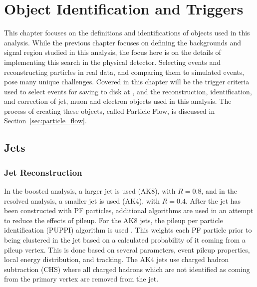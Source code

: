 \chapter{Object Identification and Triggers  }
\label{ch:objs}
This chapter focuses on the definitions and identifications of objects used in this analysis. While the previous chapter focuses on defining the backgrounds and signal region studied in this analysis, the focus here is on the details of implementing this search in the physical \CMS detector. Selecting events and reconstructing particles in real data, and comparing them to simulated events, pose many unique challenges. Covered in this chapter will be the trigger criteria used to select events for saving to disk at \CMS, and the reconstruction, identification, and correction of jet, muon and electron objects used in this analysis. The process of creating these objects, called Particle Flow, is discussed in Section~\ref{sec:particle_flow}.

\section{Jets}

\subsection{Jet Reconstruction}
\label{sec:jetreco}

In the boosted analysis, a larger jet is used (AK8), with \ensuremath{R=0.8}, and in the resolved analysis, a smaller jet is used (AK4), with \ensuremath{R=0.4}. After the jet has been constructed with PF particles, additional algorithms are used in an attempt to reduce the effects of pileup. For the AK8 jets, the pileup per particle identification (PUPPI) algorithm is used \cite{PUPPI}.  This weights each PF particle prior to being clustered in the jet based on a calculated probability of it coming from a pileup vertex.  This is done based on several parameters, event pileup properties, local energy distribution, and tracking.  The AK4 jets use charged hadron subtraction (CHS) where all charged hadrons which are not identified as coming from the primary vertex are removed from the jet.
